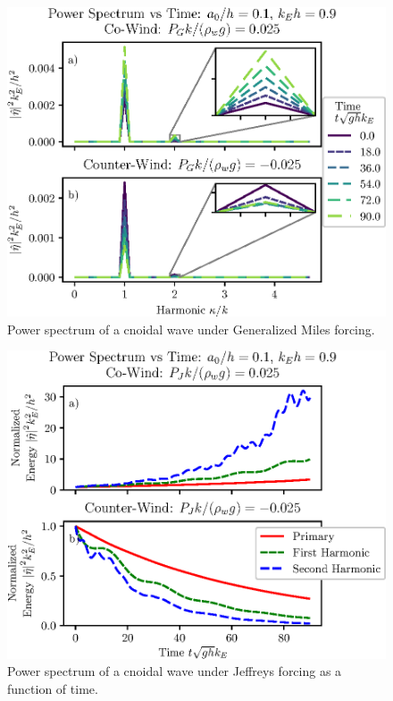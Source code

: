 \documentclass{jfm}
\begin{document}
\begin{figure}
  \centering
  \includegraphics{Power-Spectrum-GM.eps}
  \caption{
    Power spectrum of a cnoidal wave under Generalized Miles forcing.
  }
\end{figure}

\begin{figure}
  \centering
  \includegraphics{Power-Spectrum-vs-Time-Jeffreys.eps}
  \caption{
    Power spectrum of a cnoidal wave under Jeffreys forcing as a function
    of time.
  }
\end{figure}
\end{document}
